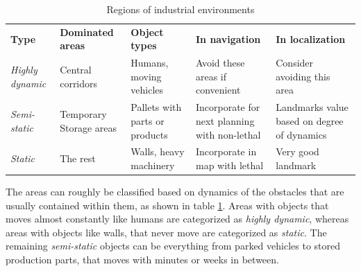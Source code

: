 \begin{table}[htbp]
	\caption{Regions of industrial environments}
	\label{tab:regions_of_industrial_environments}
	\begin{center}
		\begin{tabular}{p{} | p{2.6cm} | p{2.6cm} | p{2.6cm} | p{2.6cm}}
			\toprule
			\textbf{Type} & \textbf{Dominated areas} & \textbf{Object types} & \textbf{In navigation} & \textbf{In localization} \\ 
			\rowcolor[gray]{0.925}
			\textit{Highly dynamic} & Central corridors & Humans, moving vehicles & Avoid these areas if convenient & Consider avoiding this area \\
			\textit{Semi-static} & Temporary Storage areas & Pallets with parts or products & Incorporate for next planning with non-lethal & Landmarks value based on degree of dynamics \\ 
			\rowcolor[gray]{0.925}
			\textit{Static} & The rest & Walls, heavy machinery & Incorporate in map with lethal & Very good landmark \\			
			\bottomrule
		\end{tabular} 
	\end{center}
\end{table}

The areas can roughly be classified based on dynamics of the obstacles that are usually contained within them, as shown in table \ref{tab:regions_of_industrial_environments}. Areas with objects that moves almost constantly like humans are categorized as \textit{highly dynamic}, whereas areas with objects like walls, that never move are categorized as \textit{static}. The remaining \textit{semi-static} objects can be everything from parked vehicles to stored production parts, that moves with minutes or weeks in between. 

